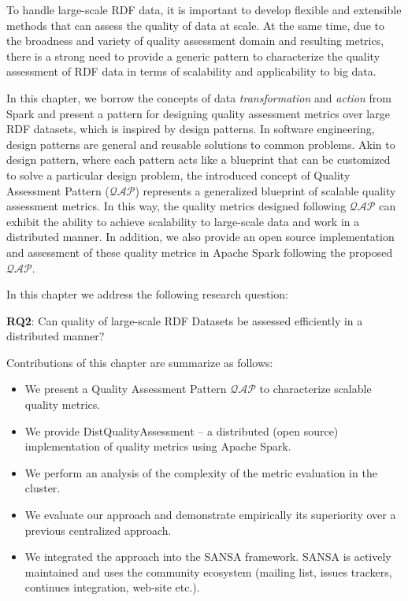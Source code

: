 To handle large-scale RDF data, it is important to develop flexible and extensible methods that can assess the quality of data at scale. 
At the same time, due to the broadness and variety of quality assessment domain and resulting metrics, there is a strong need to provide a generic pattern
to characterize the quality assessment of RDF data in terms of scalability and applicability to big data.

In this chapter, we borrow the concepts of data \textit{transformation} and \textit{action} from Spark and present a 
pattern for designing quality assessment metrics over large RDF datasets, which is inspired by design patterns.
In software engineering, design patterns are general and reusable solutions to common problems. 
Akin to design pattern, where each pattern acts like a blueprint that can be customized to solve a particular design problem, 
the introduced concept of Quality Assessment Pattern ($\mathcal{QAP}$) represents a generalized blueprint of scalable quality assessment metrics. 
In this way, the quality metrics designed following $\mathcal{QAP}$ can exhibit the ability to achieve scalability to large-scale data and work in a distributed manner.
In addition, we also provide an open source implementation and assessment of these quality metrics in Apache Spark following the proposed $\mathcal{QAP}$.

In this chapter we address the following research question:

\begin{tcolorbox}
\textbf{RQ2}: Can quality of large-scale RDF Datasets be assessed efficiently in a distributed manner?
\end{tcolorbox}

Contributions of this chapter are summarize as follows:
\begin{itemize}
    \item We present a Quality Assessment Pattern $\mathcal{QAP}$ to characterize scalable quality metrics.
    \item We provide DistQualityAssessment -- a distributed (open source) implementation of quality metrics using Apache Spark.
    \item We perform an analysis of the complexity of the metric evaluation in the cluster.
    \item We evaluate our approach and demonstrate empirically its superiority over a previous centralized approach.
    \item We integrated the approach into the SANSA framework.
    SANSA is actively maintained and uses the community ecosystem (mailing list, issues trackers, continues integration, web-site etc.).
\end{itemize}


